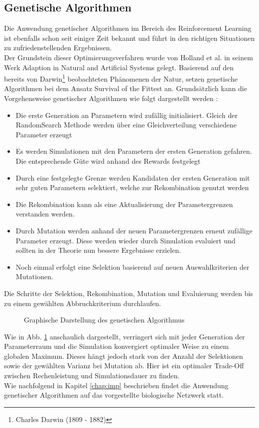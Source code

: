 	\subsection{Genetische Algorithmen}
	\label{subsec:gen_alg}
		Die Anwendung genetischer Algorithmen im Bereich des Reinforcement Learning ist ebenfalls schon seit einiger Zeit bekannt und führt in den richtigen Situationen zu zufriedenstellenden Ergebnissen.\\
		Der Grundstein dieser Optimierungsverfahren wurde von Holland et al. in seinem Werk \glqq Adaption in Natural and Artificial Systems\grqq{} \cite{Holland1992} gelegt. Basierend auf den bereits von Darwin\footnote{Charles Darwin (1809 - 1882)} beobachteten Phänomenen der Natur, setzen genetische Algorithmen bei dem Ansatz \glqq Survival of the Fittest\grqq{} an. Grundsätzlich kann die Vorgehensweise genetischer Algorithmen wie folgt dargestellt werden \cite{Goldberg1989}:
		\begin{itemize}
			\item Die erste Generation an Parametern wird zufällig initialisiert. Gleich der RandomSearch Methode werden über eine Gleichverteilung verschiedene Parameter erzeugt
			\item Es werden Simulationen mit den Parametern der ersten Generation gefahren. Die entsprechende Güte wird anhand des Rewards festgelegt
			\item Durch eine festgelegte Grenze werden Kandidaten der ersten Generation mit sehr guten Parametern selektiert, welche zur Rekombination genutzt werden
			\item Die Rekombination kann als eine Aktualisierung der Parametergrenzen verstanden werden.
			\item Durch Mutation werden anhand der neuen Parametergrenzen erneut zufällige Parameter erzeugt. Diese werden wieder durch Simulation evaluiert und sollten in der Theorie nun bessere Ergebnisse erzielen.
			\item Noch einmal erfolgt eine Selektion basierend auf neuen Auswahlkriterien der Mutationen.
		\end{itemize}
		Die Schritte der Selektion, Rekombination, Mutation und Evaluierung werden bis zu einem gewählten Abbruchkriterium durchlaufen.
		\begin{figure}[H] %
			\centering
			\def\svgwidth{12cm}
			
			\caption{Graphische Darstellung des genetischen Algorithmus}
			\label{fig:gen_chart}
		\end{figure}
		Wie in Abb. \ref{fig:gen_chart} anschaulich dargestellt, verringert sich mit jeder Generation der Parameterraum und die Simulation konvergiert optimaler Weise zu einem globalen Maximum. Dieses hängt jedoch stark von der Anzahl der Selektionen sowie der gewählten Varianz bei Mutation ab. Hier ist ein optimaler Trade-Off zwischen Rechenleistung und Simulationsdauer zu finden.\\
		Wie nachfolgend in Kapitel \ref{chap:imp} beschrieben findet die Anwendung genetischer Algorithmen auf das vorgestellte biologische Netzwerk statt.

